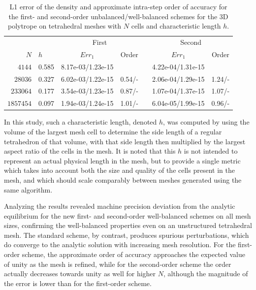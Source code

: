 \begin{table}\centering
\caption{L1 error of the density and approximate intra-step order of accuracy for the first- and second-order unbalanced/well-balanced schemes for the 3D polytrope on tetrahedral meshes with $N$ cells and characteristic length $h$.}
\label{table:polytrope}
\begin{tabular}{@{}rlccccc@{}}\toprule
&& \multicolumn{2}{c}{First} &  & \multicolumn{2}{c}{Second}\\
\cmidrule{3-4} \cmidrule{6-7}
$N$ & \phantom{al}$h$ & $Err_1$ & Order && $Err_1$ & Order\\ \midrule
$4144$ & 0.585\phantom{a} & 8.17e-03/1.23e-15 &&& 4.22e-04/1.31e-15 &\\
$28036$ & 0.327 & 6.02e-03/1.22e-15 & 0.54/- && 2.06e-04/1.29e-15 & 1.24/-\\
$233064$ & 0.177 & 3.54e-03/1.23e-15 & 0.87/- && 1.07e-04/1.37e-15 & 1.07/-\\
$1857454$ & 0.097 & 1.94e-03/1.24e-15 & 1.01/- && 6.04e-05/1.99e-15 & 0.96/-\\
\bottomrule
\end{tabular}
\end{table}

In this study, such a characteristic length, denoted $h$, was computed by using the volume of the largest mesh cell to determine the side length of a regular tetrahedron of that volume, with that side length then multiplied by the largest aspect ratio of the cells in the mesh. It is noted that this $h$ is not intended to represent an actual physical length in the mesh, but to provide a single metric which takes into account both the size and quality of the cells present in the mesh, and which should scale comparably between meshes generated using the same algorithm.

Analyzing the results revealed machine precision deviation from the analytic equilibrium for the new first- and second-order well-balanced schemes on all mesh sizes, confirming the well-balanced properties even on an unstructured tetrahedral mesh. The standard scheme, by contrast, produces spurious perturbations, which do converge to the analytic solution with increasing mesh resolution. For the first-order scheme, the approximate order of accuracy approaches the expected value of unity as the mesh is refined, while for the second-order scheme the order actually decreases towards unity as well for higher $N$, although the magnitude of the error is lower than for the first-order scheme.

